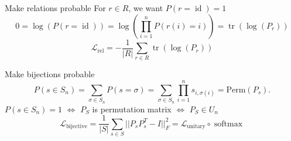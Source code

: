 \documentclass[14pt,aspectratio=169]{beamer}
\begin{document}
\begin{frame}{\color{aoblue} Make relations probable}
 For $r \in R$, we want $P(r=\operatorname{id}) = 1$
 $$
 0 = \log(P(r=\operatorname{id})) = \log(\prod_{i=1}^n P(r(i)=i)) = \operatorname{tr}(\log(P_r))
 $$
 $$
 \mathcal{L}_{\text{rel}}  = - \frac{1}{|R|} \sum_{r \in R} \operatorname{tr}(\log(P_r))
 $$
\end{frame}
\begin{frame}{\color{aoblue} Make bijections probable}
    $$
    P(s \in S_n )= \sum_{\sigma \in S_n} P(s = \sigma) = \sum_{\sigma \in S_n}   \prod_{i=1}^n s_{i, \sigma(i)}
= \text{Perm} (P_s).
    $$
    $P(s \in S_n ) = 1$ $\iff$ $P_S$ is permutation matrix $\iff$ $P_S \in U_n$
    \vfill
    $$
    \mathcal{L}_{\text{bijective}} = \frac{1}{|S|} \sum_{s \in S}||P_sP_s^T - I||_F^2  = \mathcal{L}_{\text{unitary}} \circ \operatorname{softmax}
    $$
\end{frame}
\end{document}
